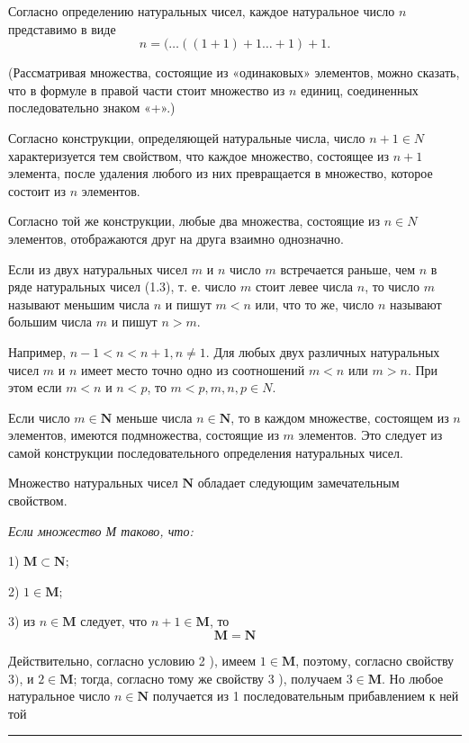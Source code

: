 \documentclass[11pt]{extbook}
\begin{document}
\setlength{\abovedisplayskip}{3pt}
\setlength{\belowdisplayskip}{3pt}
\setlength{\abovedisplayshortskip}{3pt}
\setlength{\belowdisplayshortskip}{3pt}

Согласно определению натуральных чисел, каждое натуральное число $n$ представимо в виде
\begin{equation}
  n=(\ldots((1+1)+1 \ldots+1)+1 . \tag{1.4}
\end{equation}

\noindent (Рассматривая множества, состоящие из «одинаковых» элементов, можно сказать, что в формуле в правой части стоит множество из $n$ единиц, соединенных последовательно знаком «+».)

Согласно конструкции, определяющей натуральные числа, число $n+1 \in N$ характеризуется тем свойством, что каждое множество, состоящее из $n+1$ элемента, после удаления любого из них превращается в множество, которое состоит из $n$ элементов.

Согласно той же конструкции, любые два множества, состоящие из $n \in N$ элементов, отображаются друг на друга взаимно однозначно.

Если из двух натуральных чисел $m$ и $n$ число $m$ встречается раньше, чем $n$ в ряде натуральных чисел (1.3), т. е. число $m$ стоит левее числа $n$, то число $m$ называют меньшим числа $n$ и пишут $m<n$ или, что то же, число $n$ называют большим числа $m$ и пишут $n>m$.

Например, $n-1<n<n+1, n \neq 1$. Для любых двух различных натуральных чисел $m$ и $n$ имеет место точно одно из соотношений $m<n$ или $m>n$. При этом если $m<n$ и $n<p$, то $m<p, m, n, p \in N$.

Если число $m \in \boldsymbol{N}$ меньше числа $n \in \boldsymbol{N}$, то в каждом множестве, состоящем из $n$ элементов, имеются подмножества, состоящие из $m$ элементов. Это следует из самой конструкции последовательного определения натуральных чисел.

Множество натуральных чисел $\boldsymbol{N}$ обладает следующим замечательным свойством.

\textit{Если множество М таково, что:}

1) $\boldsymbol{M} \subset \boldsymbol{N;}$

2) $1 \in \boldsymbol{M;}$

3) из $n \in \boldsymbol{M}$ следует, что $n+1 \in \boldsymbol{M}$, то
\begin{equation}
  \boldsymbol{M}=\boldsymbol{N} \tag{1.4}
\end{equation}

Действительно, согласно условию 2 ), имеем $1 \in \boldsymbol{M}$, поэтому, согласно свойству 3$)$, и $2 \in \boldsymbol{M}$; тогда, согласно тому же свойству 3 ), получаем $3 \in \boldsymbol{M}$. Но любое натуральное число $n \in \boldsymbol{N}$ получается из 1 последовательным прибавлением к ней той
\begin{center}
\rule{0.75in}{0.4pt} \\ \textit{\thepage}
\end{center}
\end{document}
